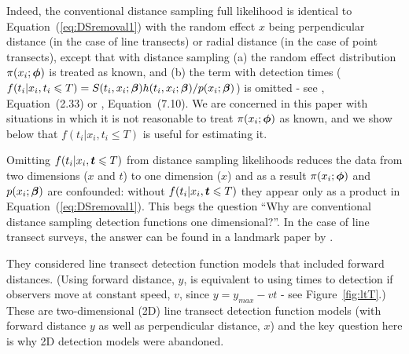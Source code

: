 \documentclass[useAMS,usenatbib,referee]{biom}
\begin{document}
Indeed, the conventional distance sampling full likelihood is identical to Equation~(\ref{eq:DSremoval1}) with the random effect $x$ being perpendicular distance (in the case of line transects) or radial distance (in the case of point transects), except that with distance sampling (a) the random effect distribution $\pi(x_i;{\mbox{\boldmath $\phi$}})$ is treated as known, and (b) the term with detection times ($f(t_i|x_i,t_i\leqslant T)=S(t_i,x_i;{\mbox{\boldmath $\beta$}})h(t_i,x_i;{\mbox{\boldmath $\beta$}})/p(x_i;{\mbox{\boldmath $\beta$}})$) is omitted - see \cite{Buckland+al:04}, Equation~(2.33) or \cite{Borchers+al:02}, Equation~(7.10). We are concerned in this paper with situations in which it is not reasonable to treat $\pi(x_i;{\mbox{\boldmath $\phi$}})$ as known, and we show below that $f(t_i|x_i,t_i\leq T)$ is useful for estimating it.

Omitting $f(t_i|x_i,\mbox{\boldmath $t$}\leqslant T)$ from distance sampling likelihoods reduces the data from two dimensions ($x$ and $t$) to one dimension ($x$) and as a result $\pi(x_i;{\mbox{\boldmath $\phi$}})$ and $p(x_i;{\mbox{\boldmath $\beta$}})$ are confounded: without $f(t_i|x_i,\mbox{\boldmath $t$}\leqslant T)$ they appear only as a product in Equation~(\ref{eq:DSremoval1}). This begs the question ``Why are conventional distance sampling detection functions one dimensional?''. In the case of line transect surveys, the answer can be found in a landmark paper by \cite{Hayes+Buckland:83}.


They considered line transect detection function models that included forward distances. (Using forward distance, $y$, is equivalent to using times to detection if observers move at constant speed, $v$, since $y=y_{max}-vt$ - see Figure~\ref{fig:ltT}.) %
These are two-dimensional (2D) line transect detection function models (with forward distance $y$ as well as perpendicular distance, $x$) and the key question here is why 2D detection models were abandoned. 
\end{document}
